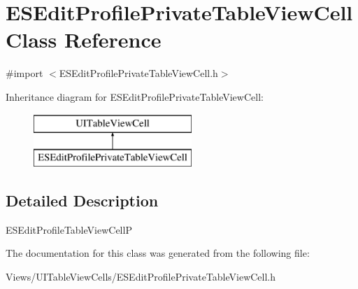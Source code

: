 \hypertarget{interface_e_s_edit_profile_private_table_view_cell}{}\section{E\+S\+Edit\+Profile\+Private\+Table\+View\+Cell Class Reference}
\label{interface_e_s_edit_profile_private_table_view_cell}


{\ttfamily \#import $<$E\+S\+Edit\+Profile\+Private\+Table\+View\+Cell.\+h$>$}

Inheritance diagram for E\+S\+Edit\+Profile\+Private\+Table\+View\+Cell\+:\begin{figure}[H]
\begin{center}
\leavevmode
\includegraphics[height=2.000000cm]{interface_e_s_edit_profile_private_table_view_cell}
\end{center}
\end{figure}


\subsection{Detailed Description}
E\+S\+Edit\+Profile\+Table\+View\+Cell\+P 

The documentation for this class was generated from the following file\+:\begin{DoxyCompactItemize}
\item 
Views/\+U\+I\+Table\+View\+Cells/E\+S\+Edit\+Profile\+Private\+Table\+View\+Cell.\+h\end{DoxyCompactItemize}
